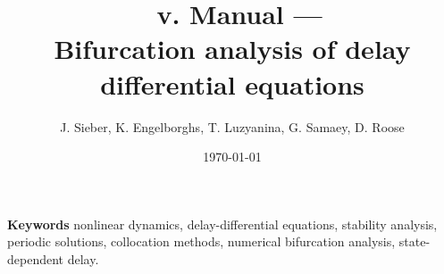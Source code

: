 \documentclass[10pt]{scrartcl}
\title{{\DDEBIFCODE\ v. \version{}} Manual --- \\
  Bifurcation analysis
          of delay differential equations}
\author{J. Sieber, K. Engelborghs, T. Luzyanina, G. Samaey, D. Roose}
\date{\today}
\newcommand{\DDEBIFCODE}{\textsc{DDE-BIFTOOL}}
\begin{document}
\maketitle



\noindent\textbf{\textsf{Keywords}} nonlinear dynamics, 
delay-differential equations, stability analysis, periodic solutions,
collocation methods, numerical bifurcation analysis, state-dependent
delay.




\end{document}
